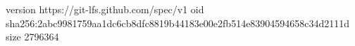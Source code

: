 version https://git-lfs.github.com/spec/v1
oid sha256:2abc9981759aa1dc6cb8dfc8819b44183e00e2fb514e83904594658c34d2111d
size 2796364
